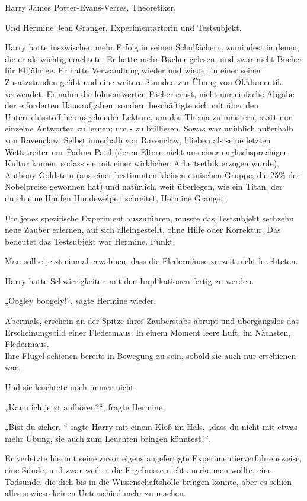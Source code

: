 {Harry James Potter-Evans-Verres, Theoretiker.

Und Hermine Jean Granger, Experimentartorin und Testsubjekt.

Harry hatte inszwischen mehr Erfolg in seinen Schulfächern, zumindest in denen, die er als wichtig erachtete. Er hatte mehr Bücher gelesen, und zwar nicht Bücher für Elfjährige. Er hatte Verwandlung wieder und wieder in einer seiner Zusatzstunden geübt und eine weitere Stunden zur Übung von Okklumentik verwendet. Er nahm die lohnenswerten Fächer ernst, nicht nur einfache Abgabe der erforderten Hausaufgaben, sondern beschäftigte sich mit über den Unterrichtsstoff herausgehender Lektüre, um das Thema zu meistern, statt nur einzelne Antworten zu lernen; um - zu brillieren. Sowas war unüblich außerhalb von Ravenclaw. Selbst innerhalb von Ravenclaw, blieben als seine letzten Wettstreiter nur Padma Patil (deren Eltern nicht aus einer englischsprachigen Kultur kamen, sodass sie mit einer wirklichen Arbeitsethik erzogen wurde), Anthony Goldstein (aus einer bestimmten kleinen etnischen Gruppe, die 25\% der Nobelpreise gewonnen hat) und natürlich, weit überlegen, wie ein Titan, der durch eine Haufen Hundewelpen schreitet, Hermine Granger.

Um jenes spezifische Experiment auszuführen, musste das Testsubjekt sechzehn neue Zauber erlernen, auf sich alleingestellt, ohne Hilfe oder Korrektur. Das bedeutet das Testsubjekt war Hermine. Punkt.

Man sollte jetzt einmal erwähnen, dass die Fledermäuse zurzeit nicht leuchteten.

Harry hatte Schwierigkeiten mit den Implikationen fertig zu werden.

„Oogley boogely!“, sagte Hermine wieder.

Abermals, erschein an der Spitze ihres Zauberstabs abrupt und übergangslos das Erscheinungsbild einer Fledermaus. In einem Moment leere Luft, im Nächsten, Fledermaus.\\ Ihre Flügel schienen bereits in Bewegung zu sein, sobald sie auch nur erschienen war.

Und sie leuchtete noch immer nicht.

„Kann ich jetzt aufhören?“, fragte Hermine.

„Bist du sicher, “ sagte Harry mit einem Kloß im Hals, „dass du nicht mit etwas mehr Übung, sie auch zum Leuchten bringen könntest?“.

Er verletzte hiermit seine zuvor eigens angefertigte Experimentierverfahrensweise, eine Sünde, und zwar weil er die Ergebnisse nicht anerkennen wollte, eine Todsünde, die dich bis in die Wissenschaftshölle bringen könnte, aber es schien alles sowieso keinen Unterschied mehr zu machen.

}
